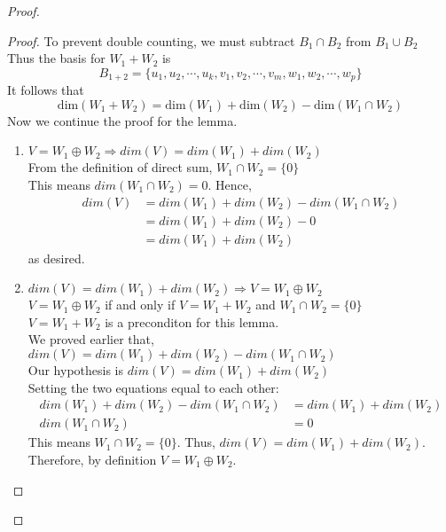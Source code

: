\documentclass[11pt]{scrartcl}
\begin{document}
\begin{enumerate}[label=\alph*.]
{\begin{proof}
\begin{lemma}
\begin{proof}
				      To prevent double counting, we must subtract $B_1 \cap B_2$ from $B_1 \cup B_2$\\
				      Thus the basis for $W_1 + W_2$ is
				      \[B_{1+2} = \{u_1, u_2, \cdots, u_k, v_1, v_2, \cdots, v_m, w_1, w_2, \cdots, w_p\}\]
				      It follows that
				      \[\text{dim}(W_1 + W_2) = \text{dim}(W_1) + \text{dim}(W_2) - \text{dim}(W_1 \cap W_2)\]
				      Now we continue the proof for the lemma.
				      \begin{enumerate}[label=\roman*.]
					      \item{
					            $V = W_1 \oplus W_2 \Rightarrow dim(V) = dim(W_1) + dim(W_2)$\\
					            From the definition of direct sum, $W_1 \cap W_2 = \{0\}$\\
					            This means $dim(W_1 \cap W_2) = 0$.
					            Hence,
					            \begin{align*}
						            dim(V) & = dim(W_1) + dim(W_2) - dim(W_1 \cap W_2) \\
						                   & = dim(W_1) + dim(W_2) - 0                 \\
						                   & = dim(W_1) + dim(W_2)
					            \end{align*}
					            as desired.
					            }
					      \item{
					            $dim(V) = dim(W_1) + dim(W_2) \Rightarrow V = W_1 \oplus W_2 $\\
					            $V = W_1 \oplus W_2$ if and only if $V = W_1 + W_2 $ and $ W_1 \cap W_2 = \{0\}$\\
					            $V = W_1 + W_2$ is a preconditon for this lemma.\\
					            We proved earlier that, $dim(V) = dim(W_1) + dim(W_2) - dim(W_1 \cap W_2)$\\
					            Our hypothesis is $dim(V) = dim(W_1) + dim(W_2)$\\
					            Setting the two equations equal to each other:
					            \begin{align*}
						            dim(W_1) + dim(W_2) - dim(W_1 \cap W_2) & = dim(W_1) + dim(W_2) \\
						            dim(W_1 \cap W_2)                       & = 0
					            \end{align*}
					            This means $ W_1 \cap W_2 = \{0\}$. Thus, $dim(V) = dim(W_1) + dim(W_2)$.
					            Therefore, by definition $V = W_1 \oplus W_2$.
					            }

\end{enumerate}
\end{proof}
\end{lemma}
\end{proof}}
\end{enumerate}
\end{document}
